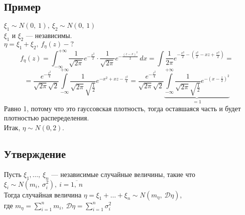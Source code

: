 \documentclass[12pt, a4paper]{article}
\begin{document}
    \subsection*{Пример}
    $\xi_1 \sim N(0,\ 1),\ \xi_2 \sim N(0,\ 1)$\\
    $\xi_1$ и $\xi_2$ --- независимы.\\
    $\eta = \xi_1 + \xi_2,\ f_{\eta}(z) - ?$
    \[f_{\eta}(z) = \int_{-\infty}^{+\infty} \frac{1}{\sqrt{2\pi}} e^{-\frac{x^2}{2}}\cdot \frac{1}{\sqrt{2\pi}} e^{-\frac{(z - x)^2}{2}}\, dx = \int\frac{1}{2\pi}e^{-\frac{x^2}{2} - \left( \frac{z^2}{2} - xz + \frac{x^2}{2} \right)}=\]
    \[=\frac{e^{-\frac{z^2}{4}}}{\sqrt{2\pi}\sqrt{2}} \int\limits_{-\infty}^{+\infty} \frac{1}{\sqrt{2\pi}\sqrt{\frac{1}{2}}} e^{-x^2 + xz - \frac{z^2}{4}} = \frac{e^{-\frac{z^2}{4}}}{\sqrt{2\pi}\sqrt{2}} \underset{=1}{\underbrace{\int\limits_{-\infty}^{+\infty} \frac{1}{\sqrt{2\pi}\sqrt{\frac{1}{2}}} e^{-(x - \frac{z}{2})^2}}}\]
    Равно 1, потому что это гауссовская плотность, тогда оставшаяся часть и будет плотностью распеределения.\\
    Итак, $\eta \sim N(0, 2)$.
    \subsection*{Утверждение}
    Пусть $\xi_1,\dots,\ \xi_n$ --- независимые случайные величины, такие что $\xi_i\sim N(m_i,\ \sigma_i^2),\ i = \overline{1,\ n}$\\
    Тогда случайная величина $\eta = \xi_1 + \dots + \xi_n \sim N(m_{\eta},\ \mathcal{D}\eta)$,\\
    где $\displaystyle m_{\eta} = \sum_{i = 1}^{n} m_i,\ \mathcal{D}\eta = \sum_{i = 1}^{n} \sigma_i^2$
\end{document}
